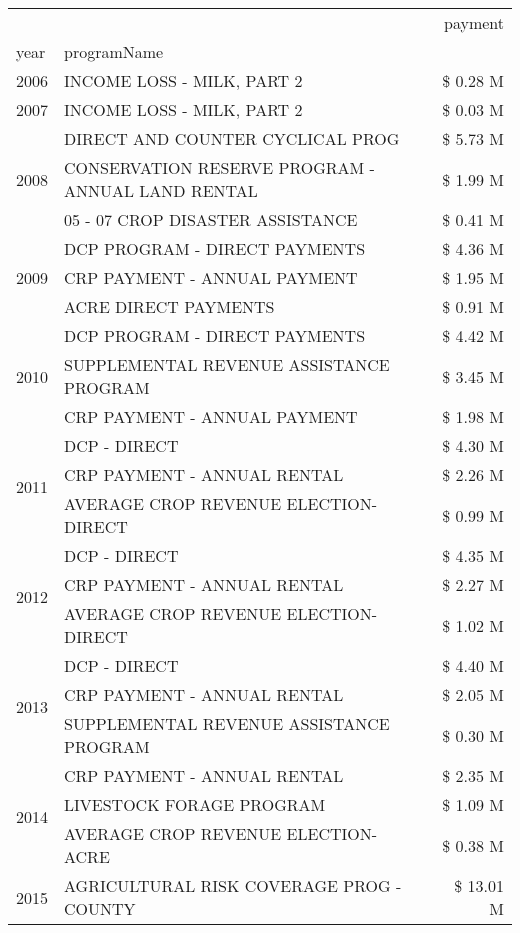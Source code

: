 \begin{tabular}{llr}
\toprule
 &  & payment \\
year & programName &  \\
\midrule
2006 & INCOME LOSS - MILK, PART 2 & \$ 0.28 M \\
\cline{1-3}
2007 & INCOME LOSS - MILK, PART 2 & \$ 0.03 M \\
\cline{1-3}
\multirow[t]{3}{*}{2008} & DIRECT AND COUNTER CYCLICAL PROG & \$ 5.73 M \\
 & CONSERVATION RESERVE PROGRAM - ANNUAL LAND RENTAL & \$ 1.99 M \\
 & 05 - 07 CROP DISASTER ASSISTANCE & \$ 0.41 M \\
\cline{1-3}
\multirow[t]{3}{*}{2009} & DCP PROGRAM - DIRECT PAYMENTS & \$ 4.36 M \\
 & CRP PAYMENT - ANNUAL PAYMENT & \$ 1.95 M \\
 & ACRE DIRECT PAYMENTS & \$ 0.91 M \\
\cline{1-3}
\multirow[t]{3}{*}{2010} & DCP PROGRAM - DIRECT PAYMENTS & \$ 4.42 M \\
 & SUPPLEMENTAL REVENUE ASSISTANCE PROGRAM & \$ 3.45 M \\
 & CRP PAYMENT - ANNUAL PAYMENT & \$ 1.98 M \\
\cline{1-3}
\multirow[t]{3}{*}{2011} & DCP - DIRECT & \$ 4.30 M \\
 & CRP PAYMENT - ANNUAL RENTAL & \$ 2.26 M \\
 & AVERAGE CROP REVENUE ELECTION-DIRECT & \$ 0.99 M \\
\cline{1-3}
\multirow[t]{3}{*}{2012} & DCP - DIRECT & \$ 4.35 M \\
 & CRP PAYMENT - ANNUAL RENTAL & \$ 2.27 M \\
 & AVERAGE CROP REVENUE ELECTION-DIRECT & \$ 1.02 M \\
\cline{1-3}
\multirow[t]{3}{*}{2013} & DCP - DIRECT & \$ 4.40 M \\
 & CRP PAYMENT - ANNUAL RENTAL & \$ 2.05 M \\
 & SUPPLEMENTAL REVENUE ASSISTANCE PROGRAM & \$ 0.30 M \\
\cline{1-3}
\multirow[t]{3}{*}{2014} & CRP PAYMENT - ANNUAL RENTAL & \$ 2.35 M \\
 & LIVESTOCK FORAGE PROGRAM & \$ 1.09 M \\
 & AVERAGE CROP REVENUE ELECTION-ACRE & \$ 0.38 M \\
\cline{1-3}
\multirow[t]{3}{*}{2015} & AGRICULTURAL RISK COVERAGE PROG - COUNTY & \$ 13.01 M \\

\end{tabular}
